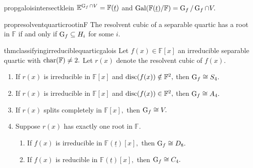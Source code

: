 \begin{restatable}[]{prop}{galoisintersectklein}
\label{prop:galoisintersectklein}
	$\mathbb{E}^{\operatorname{G}_f \cap V} = \mathbb{F}(\underline{t})$ and $\operatorname{Gal}(\mathbb{F}(\underline{t})/\mathbb{F}) = \operatorname{G}_f/\operatorname{G}_f \cap V.$ \hfill\hyperref[prop:galoisintersectklein2]{\downsym}
\end{restatable}

\begin{restatable}[]{prop}{resolventquarticrootinF}
\label{prop:resolventquarticrootinF}
	The resolvent cubic of a separable quartic has a root in $\mathbb{F}$ if and only if $\operatorname{G}_f \subseteq H_i$ for some $i.$ \hfill\hyperref[prop:resolventquarticrootinF2]{\downsym}
\end{restatable}

\begin{restatable}[]{thm}{classifyingirreduciblequarticgalois}
\label{thm:classifyingirreduciblequarticgalois}
	Let $f(x) \in \mathbb{F}[x]$ an irreducible separable quartic with $\operatorname{char}(\mathbb{F}) \neq 2.$ Let $r(x)$ denote the resolvent cubic of $f(x).$
	\begin{enumerate}
		\item If $r(x)$ is irreducible in $\mathbb{F}[x]$ and $\operatorname{disc}(f(x)) \notin \mathbb{F}^2,$ then $\operatorname{G}_f \cong S_4.$
		\item If $r(x)$ is irreducible in $\mathbb{F}[x]$ and $\operatorname{disc}(f(x)) \in \mathbb{F}^2,$ then $\operatorname{G}_f \cong A_4.$
		\item If $r(x)$ splits completely in $\mathbb{F}[x],$ then $\operatorname{G}_f \cong V.$
		\item Suppose $r(x)$ has exactly one root in $\mathbb{F}.$ 
		\begin{enumerate}
			\item If $f(x)$ is irreducible in $\mathbb{F}(\underline{t})[x],$ then $\operatorname{G}_f \cong D_8.$
			\item If $f(x)$ is reducible in $\mathbb{F}(\underline{t})[x],$ then $\operatorname{G}_f \cong C_4.$ \hfill\hyperref[thm:classifyingirreduciblequarticgalois2]{\downsym}
		\end{enumerate}
	\end{enumerate}
\end{restatable}

